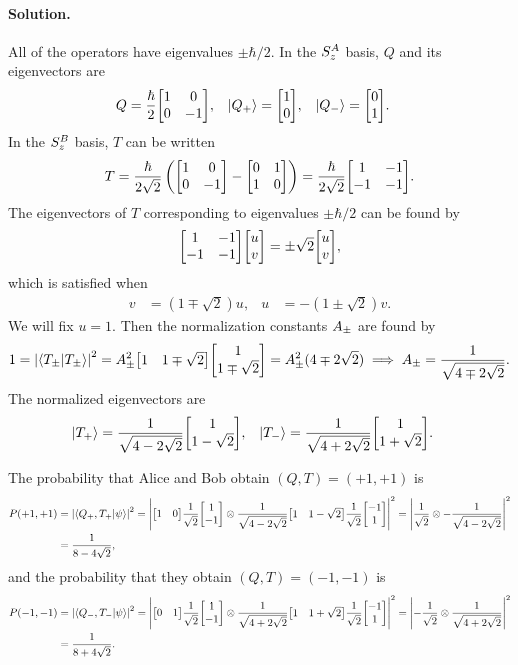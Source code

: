 \documentclass[11pt]{article}
\newcommand{\beq}{\begin{equation*}}
\newcommand{\eeq}{\end{equation*}}
\newcommand{\beqn}{\begin{equation}}
\newcommand{\eeqn}{\end{equation}}
\newcommand{\vfix}{\vspace{-\baselineskip}}
\newenvironment{solution}
{
	\paragraph{Solution.}
}
{
	\bigskip
}
\begin{document}
\begin{solution}
	All of the operators have eigenvalues $\pm \hbar/2$.  In the $S_z^A$ basis, $Q$ and its eigenvectors are
	\begin{align*}
		Q &= \frac{\hbar}{2} \mqty[ 1 & 0 \\ 0 & -1 ], &
		\kQp &= \mqty[ 1 \\ 0 ], &
		\kQm &= \mqty[ 0 \\ 1 ].
	\end{align*}
	In the $S_z^B$ basis, $T$ can be written
	\beq
		T = \frac{\hbar}{2\sqrt{2}} \left( \mqty[ 1 & 0 \\ 0 & -1 ] - \mqty[ 0 & 1 \\ 1 & 0 ] \right)
		= \frac{\hbar}{2\sqrt{2}} \mqty[ 1 & -1 \\ -1 & -1 ].
	\eeq
	The eigenvectors of $T$ corresponding to eigenvalues $\pm \hbar/2$ can be found by
	\beq
		\mqty[ 1 & -1 \\ -1 & -1 ] \mqty[ u \\ v ] = \pm\sqrt{2} \mqty[ u \\ v ],
	\eeq
	which is satisfied when
	\begin{align*}
		v &= (1 \mp \sqrt{2}) u, &
		u &= -(1 \pm \sqrt{2}) v.
	\end{align*}
	We will fix $u = 1$.  Then the normalization constants $A_\pm$ are found by
	\beqn \label{Apm}
		1 = \abs{\braket{T_\pm}}^2
		= \Apm^2 \mqty[ 1 & 1 \mp \sqrt{2} ] \mqty[ 1 \\ 1 \mp \sqrt{2} ]
		= \Apm^2 (4 \mp 2 \sqrt{2})
		\implies
		\Apm = \frac{1}{\sqrt{4 \mp 2 \sqrt{2}}}.
	\eeqn
	The normalized eigenvectors are
	\begin{align} \label{Teig}
		\kTp &= \frac{1}{\sqrt{4 - 2 \sqrt{2}}} \mqty[ 1 \\ 1 - \sqrt{2} ], &
		\kTm &= \frac{1}{\sqrt{4 + 2 \sqrt{2}}} \mqty[ 1 \\ 1 + \sqrt{2} ].
	\end{align}
	
	The probability that Alice and Bob obtain $(Q, T) = (+1, +1)$ is
	\begin{align*}
		P(+1, +1) &= \abs{\braket{Q_+, T_+}{\psi}}^2
		= \abs{ \mqty[ 1 & 0 ] \frac{1}{\sqrt{2}} \mqty[ 1 \\ -1 ] \otimes \frac{1}{\sqrt{4 - 2 \sqrt{2}}} \mqty[1 & 1 - \sqrt{2} ] \frac{1}{\sqrt{2}} \mqty[ -1 \\ 1 ] }^2
		= \abs{ \frac{1}{\sqrt{2}} \otimes -\frac{1}{\sqrt{4 - 2 \sqrt{2}}} }^2 \\
		&= \frac{1}{8 - 4 \sqrt{2}},
	\end{align*}
	and the probability that they obtain $(Q, T) = (-1, -1)$ is
	\begin{align*}
		P(-1, -1) &= \abs{\braket{Q_-, T_-}{\psi}}^2
		= \abs{ \mqty[ 0 & 1 ] \frac{1}{\sqrt{2}} \mqty[ 1 \\ -1 ] \otimes \frac{1}{\sqrt{4 + 2 \sqrt{2}}} \mqty[1 & 1 + \sqrt{2} ] \frac{1}{\sqrt{2}} \mqty[ -1 \\ 1 ] }^2
		= \abs{ -\frac{1}{\sqrt{2}} \otimes \frac{1}{\sqrt{4 + 2 \sqrt{2}}} }^2 \\
		&= \frac{1}{8 + 4 \sqrt{2}}.
	\end{align*}
	\vfix
\end{solution}
\end{document}
